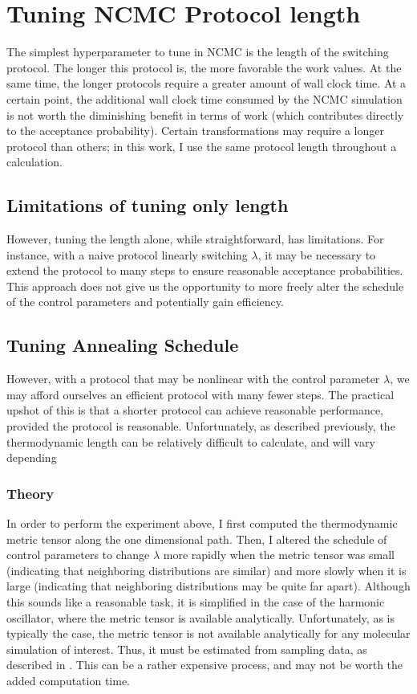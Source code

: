 \section{Tuning NCMC Protocol length}
%
The simplest hyperparameter to tune in NCMC is the length of the switching protocol. The longer this protocol is, the more favorable the work values.
%
At the same time, the longer protocols require a greater amount of wall clock time.
%
At a certain point, the additional wall clock time consumed by the NCMC simulation is not worth the diminishing benefit in terms of work (which contributes directly to the acceptance probability).
%
Certain transformations may require a longer protocol than others; in this work, I use the same protocol length throughout a calculation.
%
%
\subsection{Limitations of tuning only length}
%
However, tuning the length alone, while straightforward, has limitations.
%
For instance, with a naive protocol linearly switching $\lambda$, it may be necessary to extend the protocol to many steps to ensure reasonable acceptance probabilities.
%
This approach does not give us the opportunity to more freely alter the schedule of the control parameters and potentially gain efficiency.
%
\subsection{Tuning Annealing Schedule}
%
However, with a protocol that may be nonlinear with the control parameter $\lambda$, we may afford ourselves an efficient protocol with many fewer steps.
%
The practical upshot of this is that a shorter protocol can achieve reasonable performance, provided the protocol is reasonable.
%
Unfortunately, as described previously, the thermodynamic length can be relatively difficult to calculate, and will vary depending 
%
\subsubsection{Theory}
%
%
In order to perform the experiment above, I first computed the thermodynamic metric tensor along the one dimensional path.
%
Then, I altered the schedule of control parameters to change $\lambda$ more rapidly when the metric tensor was small (indicating that neighboring distributions are similar) and more slowly when it is large (indicating that neighboring distributions may be quite far apart).
%
Although this sounds like a reasonable task, it is simplified in the case of the harmonic oscillator, where the metric tensor is available analytically.
%
Unfortunately, as is typically the case, the metric tensor is not available analytically for any molecular simulation of interest.
%
Thus, it must be estimated from sampling data, as described in \cite{Minh2011}.
%
This can be a rather expensive process, and may not be worth the added computation time.
%
